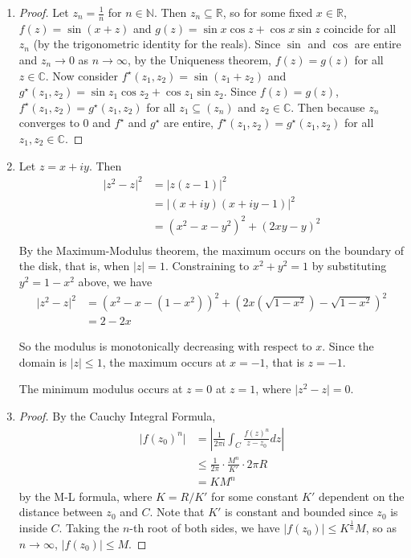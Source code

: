 \documentclass[11pt, letterpaper]{article}
\begin{document}
\begin{enumerate}
  \item \begin{proof}
    Let $z_n = \frac{1}{n}$ for $n \in \mathbb N$. Then $z_n \subseteq \mathbb R$, so for some fixed $x \in \mathbb R$,
    $f(z) = \sin(x + z)$ and  $g(z) = \sin x \cos z + \cos x \sin z$ coincide for all $z_n$ (by the trigonometric identity for the reals). Since $\sin$ and $\cos$ are entire and $z_n \to 0$ as $n \to \infty$, by the Uniqueness theorem, $f(z) = g(z)$ for all $z \in \mathbb C$. Now consider $f^\star(z_1, z_2) = \sin(z_1 + z_2)$ and $g^\star(z_1, z_2) = \sin z_1 \cos z_2 + \cos z_1 \sin z_2$. Since $f(z) = g(z)$, $f^\star(z_1, z_2) = g^\star(z_1, z_2)$ for all $z_1 \subseteq (z_n)$ and $z_2 \in \mathbb C$. Then because $z_n$ converges to 0 and $f^\star$ and $g^\star$ are entire, $f^\star(z_1, z_2) = g^\star(z_1, z_2)$ for all $z_1, z_2 \in \mathbb C$.
  \end{proof}

  \item Let $z = x + iy$. Then
  \begin{align*}
    \vert z^2 - z \vert^2
    &= \vert z(z - 1) \vert^2 \\
    &= \vert (x + iy)(x + iy - 1) \vert^2 \\
    &= (x^2 - x - y^2)^2 + (2xy - y)^2 \\
  \end{align*}
  By the Maximum-Modulus theorem, the maximum occurs on the boundary of the disk, that is, when $\vert z \vert = 1$. Constraining to $x^2 + y^2 = 1$ by substituting $y^2 = 1 - x^2$ above, we have
  \begin{align*}
    \vert z^2 - z \vert^2 &= (x^2 - x - (1 - x^2))^2 + (2x(\sqrt{1 - x^2}) - \sqrt{1 - x^2})^2 \\
    &= 2 - 2x
  \end{align*}

  So the modulus is monotonically decreasing with respect to $x$. Since the domain is $\vert z \vert \leq 1$, the maximum occurs at $x = -1$, that is $z = -1$.

  The minimum modulus occurs at $z = 0$ at $z = 1$, where $\vert z^2 - z \vert = 0$.

  \item \begin{proof}
    By the Cauchy Integral Formula, \begin{align*}
      \vert f(z_0)^n \vert 
      &= \left\vert \frac{1}{2\pi i} \int_C \frac{f(z)^n}{z - z_0} dz \right\vert \\
      &\leq \frac{1}{2\pi} \cdot \frac {M^n}{K'} \cdot 2 \pi R \\
      &= KM^n
    \end{align*}
    by the M-L formula, where $K = R/K'$ for some constant $K'$ dependent on the distance between $z_0$ and $C$. Note that $K'$ is constant and bounded since $z_0$ is inside $C$. Taking the $n$-th root of both sides, we have $\vert f(z_0) \vert \leq K^{\frac{1}{n}} M$, so as $n \to \infty$, $\vert f(z_0) \vert \leq M$.
  \end{proof}
\end{enumerate}
\end{document}
